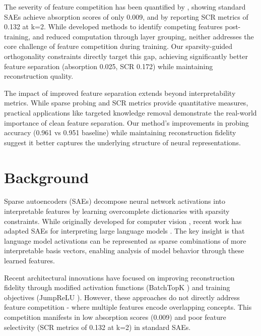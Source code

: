 \documentclass{article} %
\begin{document}
The severity of feature competition has been quantified by \cite{chaninAbsorptionStudyingFeature2024}, showing standard SAEs achieve absorption scores of only 0.009, and by \cite{karvonenEvaluatingSparseAutoencoders2024} reporting SCR metrics of 0.132 at k=2. While \cite{pauloAutomaticallyInterpretingMillions2024} developed methods to identify competing features post-training, and \cite{ghilardiEfficientTrainingSparse2024a} reduced computation through layer grouping, neither addresses the core challenge of feature competition during training. Our sparsity-guided orthogonality constraints directly target this gap, achieving significantly better feature separation (absorption 0.025, SCR 0.172) while maintaining reconstruction quality.

The impact of improved feature separation extends beyond interpretability metrics. While sparse probing \cite{gurneeFindingNeuronsHaystack2023} and SCR metrics \cite{karvonenEvaluatingSparseAutoencoders2024} provide quantitative measures, practical applications like targeted knowledge removal \cite{farrellApplyingSparseAutoencoders2024} demonstrate the real-world importance of clean feature separation. Our method's improvements in probing accuracy (0.961 vs 0.951 baseline) while maintaining reconstruction fidelity suggest it better captures the underlying structure of neural representations.

\section{Background}
\label{sec:background}

Sparse autoencoders (SAEs) decompose neural network activations into interpretable features by learning overcomplete dictionaries with sparsity constraints. While originally developed for computer vision \cite{goodfellow2016deep}, recent work has adapted SAEs for interpreting large language models \cite{gaoScalingEvaluatingSparse}. The key insight is that language model activations can be represented as sparse combinations of more interpretable basis vectors, enabling analysis of model behavior through these learned features.

Recent architectural innovations have focused on improving reconstruction fidelity through modified activation functions (BatchTopK \cite{bussmannBatchTopKSparseAutoencoders2024}) and training objectives (JumpReLU \cite{rajamanoharanJumpingAheadImproving2024}). However, these approaches do not directly address feature competition - where multiple features encode overlapping concepts. This competition manifests in low absorption scores (0.009) and poor feature selectivity (SCR metrics of 0.132 at k=2) in standard SAEs.
\end{document}
